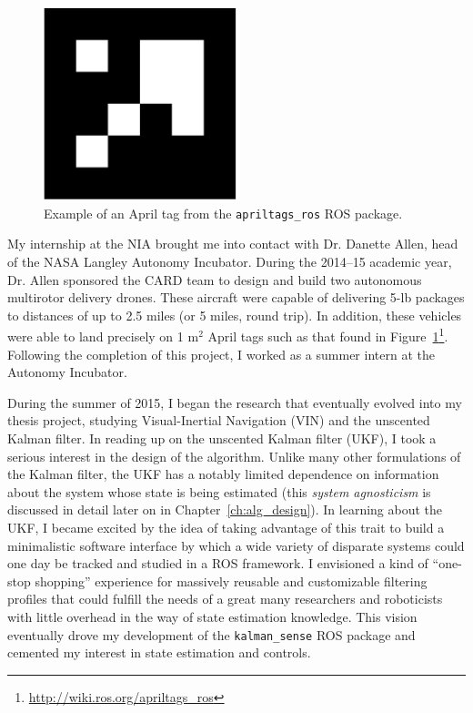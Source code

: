 \begin{figure}
  \centering
    \includegraphics[width=0.5\textwidth]{april_tag}
  \caption[Example April tag]{Example of an April tag from the \texttt{apriltags\_ros} ROS package.}
  \label{fig:april_tag}
\end{figure}

My internship at the NIA brought me into contact with Dr. Danette Allen, head of the NASA Langley Autonomy Incubator. During the 2014--15 academic year, Dr. Allen sponsored the CARD team to design and build two autonomous multirotor delivery drones. These aircraft were capable of delivering 5-lb packages to distances of up to 2.5 miles (or 5 miles, round trip). In addition, these vehicles were able to land precisely on 1 m$^2$ April tags such as that found in Figure~\ref{fig:april_tag}\footnote{\url{http://wiki.ros.org/apriltags\_ros}}. Following the completion of this project, I worked as a summer intern at the Autonomy Incubator.

During the summer of 2015, I began the research that eventually evolved into my thesis project, studying Visual-Inertial Navigation (VIN) and the unscented Kalman filter. In reading up on the unscented Kalman filter (UKF), I took a serious interest in the design of the algorithm. Unlike many other formulations of the Kalman filter, the UKF has a notably limited dependence on information about the system whose state is being estimated (this \textit{system agnosticism} is discussed in detail later on in Chapter~\ref{ch:alg_design}). In learning about the UKF, I became excited by the idea of taking advantage of this trait to build a minimalistic software interface by which a wide variety of disparate systems could one day be tracked and studied in a ROS framework. I envisioned a kind of ``one-stop shopping'' experience for massively reusable and customizable filtering profiles that could fulfill the needs of a great many researchers and roboticists with little overhead in the way of state estimation knowledge. This vision eventually drove my development of the \texttt{kalman\_sense} ROS package and cemented my interest in state estimation and controls.

